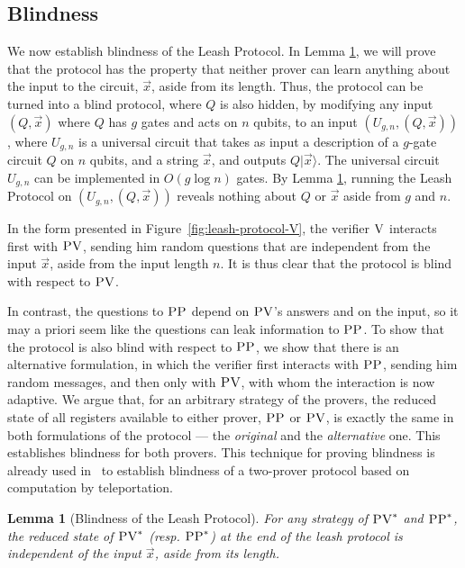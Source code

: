 \documentclass[11pt]{article}
\newtheorem{lemma}[theorem]{Lemma}
\newcommand{\ket}[1]{|#1\rangle}
\newcommand{\ver}{\textsc{V}}
\newcommand{\pv}{\textsc{PV}}
\newcommand{\pp}{\textsc{PP}}
\begin{document}
\subsection{Blindness}
\label{sec:leash-blind}

We now establish blindness of the Leash Protocol. In Lemma \ref{lem:blindness}, we will prove that the protocol has the property that neither prover can learn anything about the input to the circuit, $\vec{x}$, aside from its length. Thus, the protocol can be turned into a blind protocol, where $Q$ is also hidden, by modifying any input $(Q,\vec{x})$ where $Q$ has $g$ gates and acts on $n$ qubits, to an input $(U_{g,n},(Q,\vec{x}))$, where $U_{g,n}$ is a universal circuit that takes as input a description of a $g$-gate circuit $Q$ on $n$ qubits, and a string $\vec{x}$, and outputs $Q\ket{\vec{x}}$. The universal circuit $U_{g,n}$ can be implemented in $O(g\log n)$ gates. By Lemma \ref{lem:blindness}, running the Leash Protocol on $(U_{g,n},(Q,\vec{x}))$ reveals nothing about $Q$ or $\vec{x}$ aside from $g$ and $n$.

In the form presented in Figure~\ref{fig:leash-protocol-V}, the verifier $\ver$ interacts first with $\pv$, sending him random questions that are independent from the input $\vec{x}$, aside from the input length $n$. It is thus clear that the protocol is blind with respect to $\pv$. 

In contrast, the questions to $\pp$ depend on $\pv$'s answers and on the input, so it may a priori seem like the questions can leak information to $\pp$. To show that the protocol is also blind with respect to $\pp$, we show that there is an alternative formulation, in which the verifier first interacts with $\pp$, sending him random messages, and then only with $\pv$, with whom the interaction is now adaptive. We argue that, for an arbitrary strategy of the provers, the reduced state of all registers available to either prover, $\pp$ or $\pv$, is exactly the same in both formulations of the protocol --- the \emph{original} and the \emph{alternative} one. This establishes blindness for both provers. This technique for proving blindness is already used in~\cite{reichardt2012classical} to establish blindness of a two-prover protocol based on computation by teleportation. 


\begin{lemma}[Blindness of the Leash Protocol]\label{lem:blindness}
For any strategy of $\pv^*$ and $\pp^*$, the reduced state of $\pv^*$ (resp. $\pp^*$) at the end of the leash protocol
is independent of the input $\vec{x}$, aside from its length.
\end{lemma}
\end{document}
